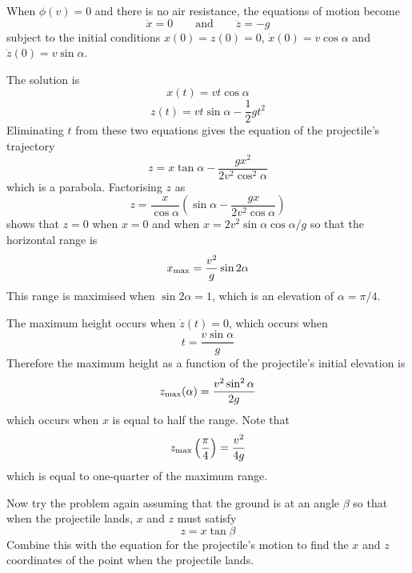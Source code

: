 \begin{example}
When $\phi(v)=0$ and there is no air resistance, the equations of motion
become
$$\ddot{x}=0\qquad\mbox{and}\qquad\ddot{z}=-g$$
subject to the initial conditions $x(0)=z(0)=0$, $\dot{x}(0)=v\cos\alpha$ 
and $\dot{z}(0)=v\sin\alpha$.

The solution is 
$$x(t)=vt\cos\alpha$$
$$z(t)=vt\sin\alpha-\frac{1}{2}gt^2$$
Eliminating $t$ from these two equations gives the equation of the
projectile's trajectory
$$z=x\tan\alpha-\frac{gx^2}{2v^2\cos^2\alpha}$$
which is a parabola.  Factorising $z$ as
$$z=\frac{x}{\cos\alpha}\left(\sin\alpha-\frac{gx}{2v^2\cos\alpha}\right)$$
shows that $z=0$ when $x=0$ and when $x=2v^2\sin\alpha\cos\alpha/g$
so that the horizontal range is
$$x_{\rm max}=\frac{v^2}{g}\sin 2\alpha$$
This range is maximised when $\sin 2\alpha=1$, which is an elevation of 
$\alpha=\pi/4$.  

The maximum height occurs when $\dot{z}(t)=0$, which occurs when
$$t=\frac{v\sin\alpha}{g}$$
Therefore the maximum height as a function of the projectile's initial
elevation is
$$z_{\rm max}(\alpha)=\frac{v^2\sin^2\alpha}{2g}$$
which occurs when $x$ is equal to half the range.  Note that
$$z_{\rm max}\left(\frac{\pi}{4}\right)=\frac{v^2}{4g}$$
which is equal to one-quarter of the maximum range.
\end{example}

\begin{exercise}
Now try the problem again assuming that the ground is at an angle $\beta$
so that when the projectile lands, $x$ and $z$ must satisfy
$$z=x\tan\beta$$
Combine this with the equation for the projectile's motion to find the $x$
and $z$ coordinates of the point when the projectile lands.
\end{exercise}



